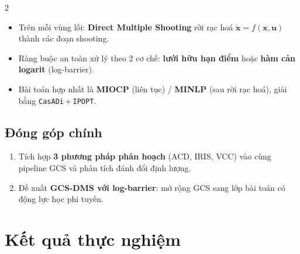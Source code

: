 \documentclass[final]{beamer}
\begin{document}
\begin{frame}[t]
\begin{multicols}{2}
\begin{itemize}
    \item Trên mỗi vùng lồi: \textbf{Direct Multiple Shooting} rời rạc hoá
    $\dot{\mathbf{x}}=f(\mathbf{x},\mathbf{u})$ thành các đoạn shooting.
    \item Ràng buộc an toàn xử lý theo 2 cơ chế: \textbf{lưới hữu hạn điểm}
    hoặc \textbf{hàm cản logarit} (log-barrier).
    \item Bài toán hợp nhất là \textbf{MIOCP} (liên tục) / \textbf{MINLP}
    (sau rời rạc hoá), giải bằng \texttt{CasADi}\,+\,\texttt{IPOPT}.
\end{itemize}

\subsection{Đóng góp chính}

\begin{enumerate}
    \item Tích hợp \textbf{3 phương pháp phân hoạch} (ACD, IRIS, VCC) vào cùng
    pipeline GCS và phân tích đánh đổi định lượng.
    \item Đề xuất \textbf{GCS-DMS với log-barrier}: mở rộng GCS sang lớp bài toán
    có động lực học phi tuyến.
\end{enumerate}


\section{Kết quả thực nghiệm}




\end{multicols}
\end{frame}
\end{document}

